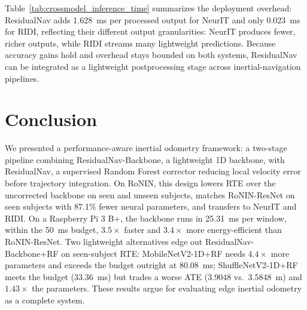 \documentclass[10pt,conference,letterpaper]{IEEEtran}
\begin{document}
Table~\ref{tab:crossmodel_inference_time} summarizes the deployment overhead: ResidualNav adds 1.628~ms per processed output for NeurIT and only 0.023~ms for RIDI, reflecting their different output granularities: NeurIT produces fewer, richer outputs, while RIDI streams many lightweight predictions. Because accuracy gains hold and overhead stays bounded on both systems, ResidualNav can be integrated as a lightweight postprocessing stage across inertial-navigation pipelines.

\section{Conclusion}
\label{sec:conclusion}


We presented a performance-aware inertial odometry framework: a two-stage pipeline combining ResidualNav-Backbone, a lightweight 1D backbone, with ResidualNav, a supervised Random Forest corrector reducing local velocity error before trajectory integration. On RoNIN, this design lowers RTE over the uncorrected backbone on seen and unseen subjects, matches RoNIN-ResNet on seen subjects with 87.1\% fewer neural parameters, and transfers to NeurIT and RIDI. On a Raspberry Pi 3 B+, the backbone runs in 25.31~ms per window, within the 50~ms budget, $3.5\times$ faster and $3.4\times$ more energy-efficient than RoNIN-ResNet. Two lightweight alternatives edge out ResidualNav-Backbone+RF on seen-subject RTE: MobileNetV2-1D+RF needs $4.4\times$ more parameters and exceeds the budget outright at 80.08~ms; ShuffleNetV2-1D+RF meets the budget (33.36~ms) but trades a worse ATE (3.9048 vs.\ 3.5848~m) and $1.43\times$ the parameters. These results argue for evaluating edge inertial odometry as a complete system.
\end{document}
